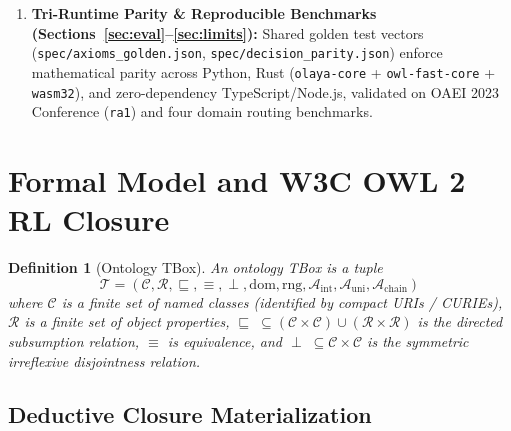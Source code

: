 \documentclass[11pt,a4paper]{article}
\newtheorem{definition}[theorem]{Definition}
\begin{document}
\begin{enumerate}[leftmargin=1.8em,itemsep=0.25em]
  \item \textbf{Tri-Runtime Parity \& Reproducible Benchmarks (Sections~\ref{sec:eval}--\ref{sec:limits}):} Shared golden test vectors (\texttt{spec/axioms\_golden.json}, \texttt{spec/decision\_parity.json}) enforce mathematical parity across Python, Rust (\texttt{olaya-core} + \texttt{owl-fast-core} + \texttt{wasm32}), and zero-dependency TypeScript/Node.js, validated on OAEI 2023 Conference (\texttt{ra1}) and four domain routing benchmarks.
\end{enumerate}

\section{Formal Model and W3C OWL 2 RL Closure}
\label{sec:owl2rl}

\begin{definition}[Ontology TBox]
An ontology TBox is a tuple
\[
  \mathcal{T} = (\mathcal{C}, \mathcal{R}, \sqsubseteq, \equiv, \perp, \mathrm{dom}, \mathrm{rng}, \mathcal{A}_{\mathrm{int}}, \mathcal{A}_{\mathrm{uni}}, \mathcal{A}_{\mathrm{chain}})
\]
where $\mathcal{C}$ is a finite set of named classes (identified by compact URIs / CURIEs), $\mathcal{R}$ is a finite set of object properties, $\sqsubseteq \;\subseteq (\mathcal{C} \times \mathcal{C}) \cup (\mathcal{R} \times \mathcal{R})$ is the directed subsumption relation, $\equiv$ is equivalence, and $\perp \;\subseteq \mathcal{C} \times \mathcal{C}$ is the symmetric irreflexive disjointness relation.
\end{definition}

\subsection{Deductive Closure Materialization}
\end{document}
